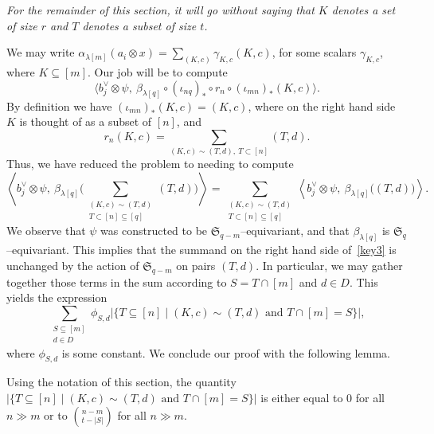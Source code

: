 \documentclass[ALCO,ThmDefs,Unicode,epreuves]{cedram}
\newcommand{\Sn}{\mathfrak{S}}
\begin{document}
\emph{For the remainder of this section, it will go without saying that $K$ denotes a set of size $r$ and $T$ denotes a subset of size $t$.}

We may write $\alpha_{\lambda[m]}(a_i \otimes x) = \sum_{(K,c)} \gamma_{K,c} (K,c)$, for some scalars $\gamma_{K,c}$, where $K \subseteq [m]$. Our job will be to compute
\[
\langle b_j^\vee \otimes \psi,\ \beta_{\lambda[q]} \circ (\iota_{nq})_\ast \circ r_n \circ (\iota_{mn})_\ast(K,c) \rangle .
\]
By definition we have $(\iota_{mn})_\ast(K,c) = (K,c)$, where on the right hand side $K$ is thought of as a subset of $[n]$, and 
\[
r_n(K,c) = \sum_{(K,c) \sim (T,d), \ T \subset [n]}(T,d).
\]
Thus, we have reduced the problem to needing to compute
\begin{equation}
\left\langle b_j^\vee \otimes \psi,\ \beta_{\lambda[q]}{\Bigg(} \sum_{\substack{ (K,c) \sim (T,d) \\ T \subset [n] \subseteq [q]}} (T,d) {\Bigg)} \right\rangle = 
\sum_{\substack{ (K,c) \sim (T,d) \\ T \subset [n] \subseteq [q]}} \left\langle b_j^\vee \otimes \psi,\ \beta_{\lambda[q]}{\Big(} (T,d) {\Big)} \right\rangle
.\label{key3}
\end{equation}
We observe that $\psi$ was constructed to be $\Sn_{q-m}$--equivariant, and that $\beta_{\lambda[q]}$ is $\Sn_{q}$--equivariant. 
This implies that the summand on the right hand side of~\eqref{key3} is unchanged by the action of $\Sn_{q-m}$ on pairs $(T,d)$. In particular, we may gather together those terms in the sum
according to $S = T \cap [m]$ and $d \in D$. This yields the expression
\[
\sum_{\substack{S \subseteq [m]\\ d \in D}} \phi_{S,d} \left| \{T \subseteq [n] \mid (K,c) \sim (T,d) \text{ and } T \cap [m] = S\}\right|,
\]
where $\phi_{S,d}$ is some constant. We conclude our proof with the following lemma.


\begin{lemma}
Using the notation of this section, the quantity $|\{T \subseteq [n] \mid (K,c) \sim (T,d) \text{ and } T \cap [m] = S\}|$ is either equal to 0 for all $n \gg m$ or to $\binom{n-m}{t - |S|}$ for all $n \gg m$. 
\end{lemma}
\end{document}
